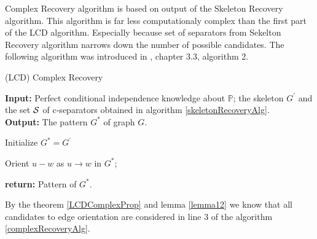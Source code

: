 %
%

Complex Recovery algorithm is based on output of the Skeleton Recovery algorithm.
This algorithm is far less computationaly complex than the first part of the LCD algorithm. Especially because set of separators
from Sekelton Recovery algorithm narrows down the number of possible candidates.
The following algorithm was introduced in \cite{CG}, chapter 3.3, algorithm 2.

\begin{algorithm}
	\caption{(LCD) Complex Recovery}\label{complexRecoveryAlg}
	
	\textbf{Input:} Perfect conditional independence knowledge about $\mathbb{P}$; the skeleton $G^{'}$ and the set 
					$\mathcal{S}$ of c-separators obtained in algorithm \ref{skeletonRecoveryAlg}.  \\
	\textbf{Output:} The pattern $G^{*}$ of graph $G$.

	
	\begin{algorithmic}[1]
			\State Initialize $G^{*} = G^{'}$ 
	
						\State Orient $u - w$ as $u \rightarrow w$ in $G^{*}$;
					\EndIf
				\EndFor
			\EndFor			
			
			\State \textbf{return:} Pattern of $G^{*}$.
		\EndProcedure
	\end{algorithmic}
\end{algorithm}

By the theorem \ref{LCDComplexProp} and lemma \ref{lemma12} we know that all candidates to edge orientation
are considered in line 3 of the algorithm \ref{complexRecoveryAlg}. 


